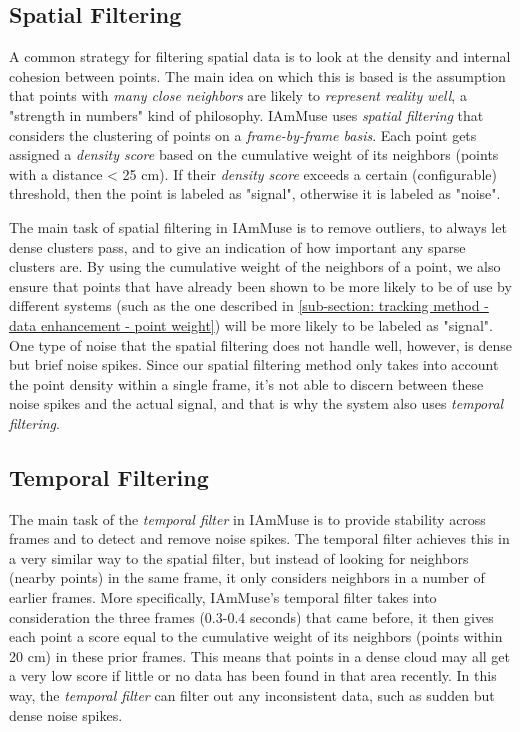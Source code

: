 \subsection{Spatial Filtering}
\label{sub-section: tracking method - data filtering - density filtering}

A common strategy for filtering spatial data is to look at the density and internal cohesion between points.
The main idea on which this is based is the assumption that points with \textit{many close neighbors} are likely to \textit{represent reality well}, a "strength in numbers" kind of philosophy.
IAmMuse uses \textit{spatial filtering} that considers the clustering of points on a \textit{frame-by-frame basis}.
Each point gets assigned a \textit{density score} based on the cumulative weight of its neighbors (points with a distance < 25 cm). 
If their \textit{density score} exceeds a certain (configurable) threshold, then the point is labeled as "signal", otherwise it is labeled as "noise".

The main task of spatial filtering in IAmMuse is to remove outliers, to always let dense clusters pass, and to give an indication of how important any sparse clusters are.
By using the cumulative weight of the neighbors of a point, we also ensure that points that have already been shown to be more likely to be of use by different systems (such as the one described in \cref{sub-section: tracking method - data enhancement - point weight}) will be more likely to be labeled as "signal".
One type of noise that the spatial filtering does not handle well, however, is dense but brief noise spikes.
Since our spatial filtering method only takes into account the point density within a single frame, it's not able to discern between these noise spikes and the actual signal, and that is why the system also uses \textit{temporal filtering}.



\subsection{Temporal Filtering}
\label{sub-section: tracking method - data filtering - temporal filtering}
The main task of the \textit{temporal filter} in IAmMuse is to provide stability across frames and to detect and remove noise spikes.
The temporal filter achieves this in a very similar way to the spatial filter, but instead of looking for neighbors (nearby points) in the same frame, it only considers neighbors in a number of earlier frames.
More specifically, IAmMuse's temporal filter takes into consideration the three frames (0.3-0.4 seconds) that came before, it then gives each point a score equal to the cumulative weight of its neighbors (points within 20 cm) in these prior frames.
This means that points in a dense cloud may all get a very low score if little or no data has been found in that area recently.
In this way, the \textit{temporal filter} can filter out any inconsistent data, such as sudden but dense noise spikes.

